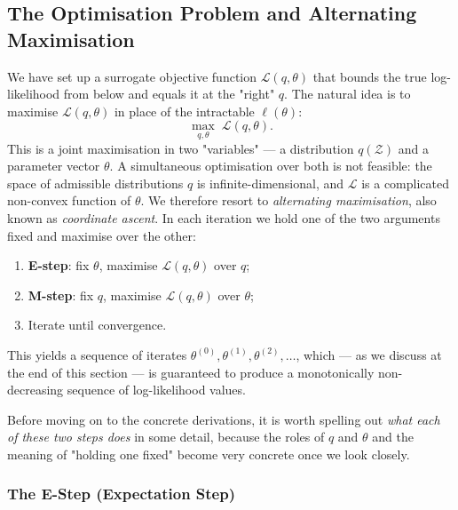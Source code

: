 \documentclass[11pt, a4paper, oneside]{article}
\begin{document}
\subsection{The Optimisation Problem and Alternating Maximisation}

We have set up a surrogate objective function $\mathcal{L}(q, \theta)$
that bounds the true log-likelihood from below and equals it at the
"right" $q$. The natural idea is to maximise $\mathcal{L}(q, \theta)$
in place of the intractable $\ell(\theta)$:
\[
\max_{q, \theta} \;\mathcal{L}(q, \theta).
\]
This is a joint maximisation in two "variables" — a distribution
$q(\mathcal{Z})$ and a parameter vector $\theta$. A simultaneous
optimisation over both is not feasible: the space of admissible
distributions $q$ is infinite-dimensional, and $\mathcal{L}$ is a
complicated non-convex function of $\theta$. We therefore resort to
\emph{alternating maximisation}, also known as \emph{coordinate
ascent}. In each iteration we hold one of the two arguments fixed and
maximise over the other:
\begin{enumerate}[leftmargin=1.5em, itemsep=3pt]
    \item \textbf{E-step}: fix $\theta$, maximise $\mathcal{L}(q, \theta)$ over $q$;
    \item \textbf{M-step}: fix $q$, maximise $\mathcal{L}(q, \theta)$ over $\theta$;
    \item Iterate until convergence.
\end{enumerate}
This yields a sequence of iterates $\theta^{(0)}, \theta^{(1)},
\theta^{(2)}, \ldots$, which — as we discuss at the end of this section —
is guaranteed to produce a monotonically non-decreasing sequence of
log-likelihood values.

Before moving on to the concrete derivations, it is worth spelling out
\emph{what each of these two steps does} in some detail, because the
roles of $q$ and $\theta$ and the meaning of "holding one fixed" become
very concrete once we look closely.

\subsubsection{The E-Step (Expectation Step)}
\label{subsec:e-step-preview}
\end{document}
